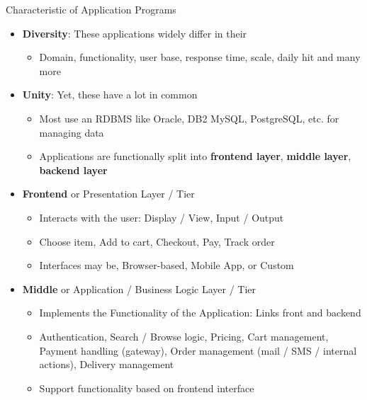 \documentclass[aspectratio=169, xcolor=dvipsnames]{beamer}
\begin{document}
\begin{frame}{Characteristic of Application Programs}
    \begin{itemize}[<+->]
        \item \textbf{Diversity}: These applications widely differ in their
        \begin{itemize}
            \item[$\triangleright$] Domain, functionality, user base, response time, scale, daily hit and many more
        \end{itemize}
        \item \textbf{Unity}: Yet, these have a lot in common
        \begin{itemize}
            \item[$\triangleright$] Most use an RDBMS like Oracle, DB2 MySQL, PostgreSQL, etc. for managing data
            \item[$\triangleright$] Applications are functionally split into \textbf{frontend layer}, \textbf{middle layer}, \textbf{backend layer}
        \end{itemize}
        \item \textbf{Frontend} or Presentation Layer / Tier
        \begin{itemize}
            \item[$\triangleright$] Interacts with the user: Display / View, Input / Output
            \item[$\triangleright$] Choose item, Add to cart, Checkout, Pay, Track order
            \item[$\triangleright$] Interfaces may be, Browser-based, Mobile App, or Custom
        \end{itemize}
        \item \textbf{Middle} or Application / Business Logic Layer / Tier
        \begin{itemize}
            \item[$\triangleright$] Implements the Functionality of the Application: Links front and backend
            \item[$\triangleright$] Authentication, Search / Browse logic, Pricing, Cart management, Payment handling (gateway), Order management (mail / SMS / internal actions), Delivery management
            \item[$\triangleright$] Support functionality based on frontend interface
        \end{itemize}
    \end{itemize}
\end{frame}
\end{document}
